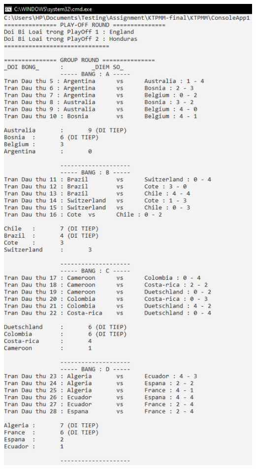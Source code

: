 \documentclass[a4paper]{article}
\begin{document}
\begin{center}
\includegraphics[scale=0.6]{hinh26.png}
\end{center}
\end{document}
